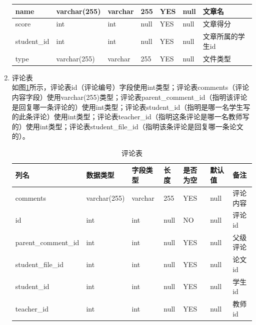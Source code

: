 \begin{enumerate}
\begin{table}[H]
\begin{tabular}{|l|l|l|l|l|l|l|}
                  name           & varchar(255) & varchar  & 255      & YES      & null   & 文章名           \\ \hline
                  score          & int          & int      & null     & YES      & null   & 文章得分         \\ \hline
                  student\_id    & int          & int      & null     & YES      & null   & 文章所属的学生id \\ \hline
                  type           & varchar(255) & varchar  & 255      & YES      & null   & 文件类型         \\ \hline
              \end{tabular}
          \end{table}
    \item 评论表\\
          如图\ref{db-comment}所示，评论表id（评论编号）字段使用int类型；评论表comments（评论内容字段）使用varchar(255)类型；评论表parent\_comment\_id（指明该评论是回复哪一条评论的）使用int类型；评论表student\_id（指明是哪一名学生写的此条评论）使用int类型；评论表teacher\_id（指明这条评论是哪一名教师写的）使用int类型；评论表student\_file\_id（指明该条评论是回复哪一条论文的）。
          \begin{table}[H]
              \centering
              \song\wuhao
              \caption{评论表}
              \label{db-comment}
              \begin{tabular}{|l|l|l|l|l|l|l|}
                  \hline
                  列名                & 数据类型     & 字段类型 & 长度 & 是否为空 & 默认值 & 备注     \\ \hline
                  comments            & varchar(255) & varchar  & 255  & YES      & null   & 评论内容 \\ \hline
                  id                  & int          & int      & null & NO       & null   & 评论id   \\ \hline
                  parent\_comment\_id & int          & int      & null & YES      & null   & 父级评论 \\ \hline
                  student\_file\_id   & int          & int      & null & YES      & null   & 论文id   \\ \hline
                  student\_id         & int          & int      & null & YES      & null   & 学生id   \\ \hline
                  teacher\_id         & int          & int      & null & YES      & null   & 教师id   \\ \hline

\end{tabular}
\end{table}
\end{enumerate}
